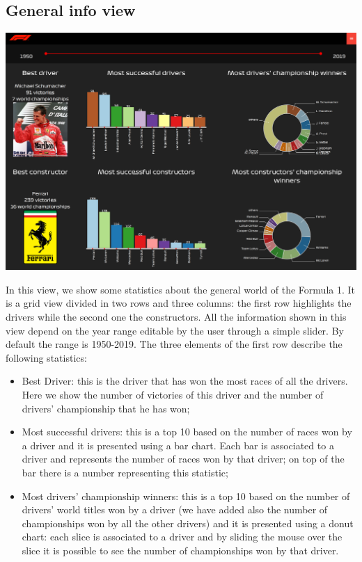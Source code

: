 \documentclass[11pt,twocolumn,letterpaper]{article}
\begin{document}
\subsection{General info view}
\begin{center}
	\centering
	\includegraphics[width=\columnwidth]{generalinfo}
\end{center}
In this view, we show some statistics about the general world of the Formula 1. It is a grid view divided in two rows and three columns: the first row highlights the drivers while the second one the constructors. All the information shown in this view depend on the year range editable by the user through a simple slider. By default the range is 1950-2019. The three elements of the first row describe the following statistics:
\begin{itemize}
	\item Best Driver: this is the driver that has won the most races of all the drivers. Here we show the number of victories of this driver and the number of drivers' championship that he has won;
	\item Most successful drivers: this is a top 10 based on the number of races won by a driver and it is presented using a bar chart. Each bar is associated to a driver and represents the number of races won by that driver; on top of the bar there is a number representing this statistic;
	\item Most drivers' championship winners: this is a top 10 based on the number of drivers' world titles won by a driver (we have added also the number of championships won by all the other drivers) and it is presented using a donut chart: each slice is associated to a driver and by sliding the mouse over the slice it is possible to see the number of championships won by that driver.
\end{itemize}
\end{document}
